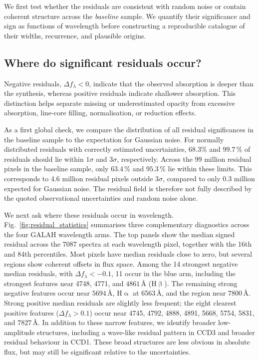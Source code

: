 \documentclass[twocolumn,apj,numberedappendix,appendixfloats]{openjournal}
\begin{document}
We first test whether the residuals are consistent with random noise or contain coherent structure across the \textit{baseline} sample. We quantify their significance and sign as functions of wavelength before constructing a reproducible catalogue of their widths, recurrence, and plausible origins.

\subsection{Where do significant residuals occur?}
\label{sec:analysis_significance}

Negative residuals, $\Delta f_\lambda<0$, indicate that the observed absorption is deeper than the synthesis, whereas positive residuals indicate shallower absorption. This distinction helps separate missing or underestimated opacity from excessive absorption, line-core filling, normalisation, or reduction effects.

As a first global check, we compare the distribution of all residual significances in the baseline sample to the expectation for Gaussian noise. For normally distributed residuals with correctly estimated uncertainties, 68.3\% and $99.7\,\mathrm{\%}$ of residuals should lie within $1\sigma$ and $3\sigma$, respectively. Across the 99 million residual pixels in the baseline sample, only $63.4\,\mathrm{\%}$ and $95.3\,\mathrm{\%}$ lie within these limits. This corresponds to 4.6 million residual pixels outside $3\sigma$, compared to only 0.3 million expected for Gaussian noise. The residual field is therefore not fully described by the quoted observational uncertainties and random noise alone.

We next ask where these residuals occur in wavelength. Fig.~\ref{fig:residual_statistics} summarises three complementary diagnostics across the four GALAH wavelength arms. The top panels show the median signed residual across the 7087 spectra at each wavelength pixel, together with the 16th and 84th percentiles. Most pixels have median residuals close to zero, but several regions show coherent offsets in flux space. Among the 14 strongest negative median residuals, with $\Delta f_\lambda < -0.1$, 11 occur in the blue arm, including the strongest features near 4748, 4771, and $4861\,\text{\AA}$ ($\mathrm{H}\upbeta$). The remaining strong negative features occur near $5694\,\text{\AA}$, $\mathrm{H}\upalpha$ at 6563\,\AA, and the region near $7800\,\text{\AA}$. Strong positive median residuals are slightly less frequent; the eight clearest positive features ($\Delta f_\lambda > 0.1$) occur near 4745, 4792, 4888, 4891, 5668, 5754, 5831, and $7827\,\text{\AA}$. In addition to these narrow features, we identify broader low-amplitude structures, including a wave-like residual pattern in CCD3 and broader residual behaviour in CCD1. These broad structures are less obvious in absolute flux, but may still be significant relative to the uncertainties.
\end{document}
